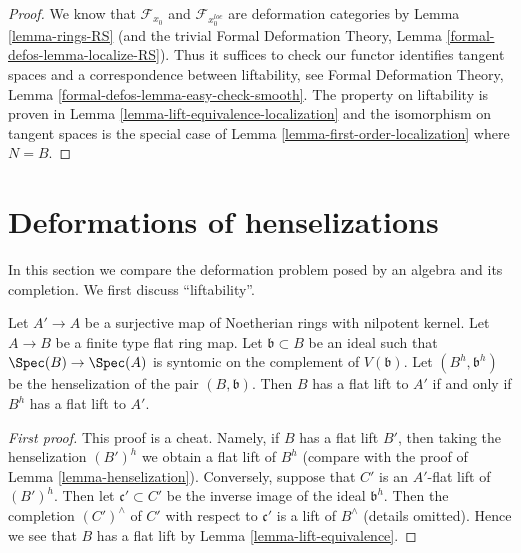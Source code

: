 \begin{proof}
We know that $\mathcal{F}_{x_0}$ and $\mathcal{F}_{x_0^{loc}}$
are deformation categories by Lemma \ref{lemma-rings-RS}
(and the trivial Formal Deformation Theory, Lemma
\ref{formal-defos-lemma-localize-RS}). Thus it suffices to check
our functor identifies tangent spaces and a correspondence
between liftability, see
Formal Deformation Theory, Lemma \ref{formal-defos-lemma-easy-check-smooth}.
The property on liftability is proven in
Lemma \ref{lemma-lift-equivalence-localization}
and the isomorphism on tangent spaces is the special case of
Lemma \ref{lemma-first-order-localization} where $N = B$.
\end{proof}



\section{Deformations of henselizations}
\label{section-compare-henselization}

\noindent
In this section we compare the deformation problem posed
by an algebra and its completion.
We first discuss ``liftability''.

\begin{lemma}
\label{lemma-lift-equivalence-henselization}
Let $A' \to A$ be a surjective map of Noetherian rings with nilpotent kernel.
Let $A \to B$ be a finite type flat ring map.
Let $\mathfrak b \subset B$ be an ideal such that
$\Spec(B) \to \Spec(A)$ is syntomic on the complement of $V(\mathfrak b)$.
Let $(B^h, \mathfrak b^h)$ be the henselization of the pair $(B, \mathfrak b)$.
Then $B$ has a flat lift to $A'$ if and only if $B^h$ has a flat lift to $A'$.
\end{lemma}

\begin{proof}[First proof]
This proof is a cheat. Namely, if $B$ has a flat lift $B'$, then
taking the henselization $(B')^h$ we obtain a flat lift of $B^h$
(compare with the proof of Lemma \ref{lemma-henselization}).
Conversely, suppose that $C'$ is an $A'$-flat lift of $(B')^h$.
Then let $\mathfrak c' \subset C'$ be the inverse image of the
ideal $\mathfrak b^h$. Then the completion $(C')^\wedge$ of
$C'$ with respect to $\mathfrak c'$ is a lift of $B^\wedge$ (details omitted).
Hence we see that $B$ has a flat lift by
Lemma \ref{lemma-lift-equivalence}.
\end{proof}

